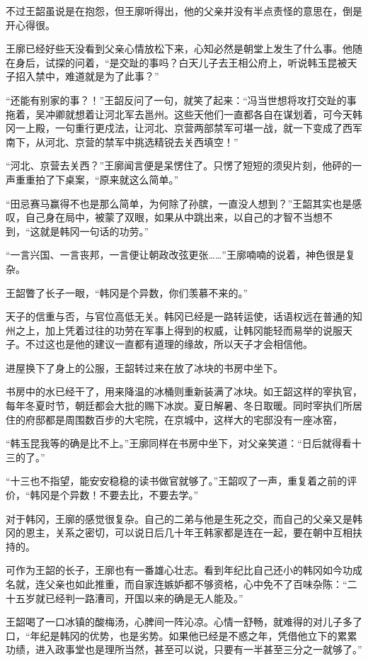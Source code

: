 不过王韶虽说是在抱怨，但王廓听得出，他的父亲并没有半点责怪的意思在，倒是开心得很。

王廓已经好些天没看到父亲心情放松下来，心知必然是朝堂上发生了什么事。他随在身后，试探的问着，“是交趾的事吗？白天儿子去王相公府上，听说韩玉昆被天子招入禁中，难道就是为了此事？”

“还能有别家的事？！”王韶反问了一句，就笑了起来：“冯当世想将攻打交趾的事拖着，吴冲卿就想着让河北军去邕州。这些天他们一直都各自在谋划着，可今天韩冈一上殿，一句重行更戍法，让河北、京营两部禁军可堪一战，就一下变成了西军南下，从河北、京营的禁军中挑选精锐去关西填空！”

“河北、京营去关西？”王廓闻言便是呆愣住了。只愣了短短的须臾片刻，他砰的一声重重拍了下桌案，“原来就这么简单。”

“田忌赛马赢得不也是那么简单，为何除了孙膑，一直没人想到？”王韶其实也是感叹，自己身在局中，被蒙了双眼，如果从中跳出来，以自己的才智不当想不到，“这就是韩冈一句话的功劳。”

“一言兴国、一言丧邦，一言便让朝政改弦更张……”王廓喃喃的说着，神色很是复杂。

王韶瞥了长子一眼，“韩冈是个异数，你们羡慕不来的。”

天子的信重与否，与官位高低无关。韩冈已经是一路转运使，话语权远在普通的知州之上，加上凭着过往的功劳在军事上得到的权威，让韩冈能轻而易举的说服天子。不过这也是他的建议一直都有道理的缘故，所以天子才会相信他。

进屋换下了身上的公服，王韶转过来在放了冰块的书房中坐下。

书房中的水已经干了，用来降温的冰桶则重新装满了冰块。如王韶这样的宰执官，每年冬夏时节，朝廷都会大批的赐下冰炭。夏日解暑、冬日取暖。同时宰执们所居住的府邸都是周围数百步的大宅院，在京城中，这样大的宅邸没有一座冰窑，

“韩玉昆我等的确是比不上。”王廓同样在书房中坐下，对父亲笑道：“日后就得看十三的了。”

“十三也不指望，能安安稳稳的读书做官就够了。”王韶叹了一声，重复着之前的评价，“韩冈是个异数！不要去比，不要去学。”

对于韩冈，王廓的感觉很复杂。自己的二弟与他是生死之交，而自己的父亲又是韩冈的恩主，关系之密切，可以说日后几十年王韩家都是连在一起，要在朝中互相扶持的。

可作为王韶的长子，王廓也有一番雄心壮志。看到年纪比自己还小的韩冈如今功成名就，连父亲也如此推重，而自家连嫉妒都不够资格，心中免不了百味杂陈：“二十五岁就已经判一路漕司，开国以来的确是无人能及。”

王韶喝了一口冰镇的酸梅汤，心脾间一阵沁凉。心情一舒畅，就难得的对儿子多了口，“年纪是韩冈的优势，也是劣势。如果他已经是不惑之年，凭借他立下的累累功绩，进入政事堂也是理所当然，甚至可以说，只要有一半甚至三分之一就够了。”


